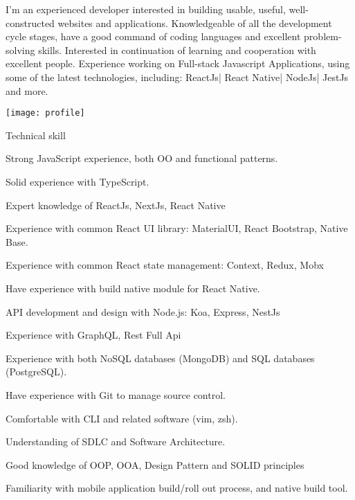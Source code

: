 \documentclass{resume}
\begin{document}

  \noindent\begin{minipage}{0.8\textwidth}%
    I'm an experienced developer interested in building usable, useful, well-constructed websites and applications. 
    Knowledgeable of all the development cycle stages, have a good command of coding languages and excellent problem-solving skills.
    Interested in continuation of learning and cooperation with excellent people.
    Experience working on Full-stack Javascript Applications, using some of the latest technologies, including:
    ReactJs| React Native| NodeJs| JestJs and more.
    \end{minipage}%
    \hfill%
    \begin{minipage}{0.1\textwidth}\raggedright
      \texttt{[image: profile]}
    \end{minipage}

  \begin{rSection}{Technical skill}
    \begin{rSubsection}{}{}{}{}
      \item Strong JavaScript experience, both OO and functional patterns.
      \item Solid experience with TypeScript.
      \item Expert knowledge of ReactJs, NextJs, React Native
      \item Experience with common React UI library: MaterialUI, React Bootstrap, Native Base.
      \item Experience with common React state management: Context, Redux, Mobx
      \item Have experience with build native module for React Native.

      \item API development and design with Node.js: Koa, Express, NestJs
      \item Experience with GraphQL, Rest Full Api
      \item Experience with both NoSQL databases (MongoDB) and SQL databases (PostgreSQL).

      \item Have experience with Git to manage source control.
      \item Comfortable with CLI and related software (vim, zsh).
      \item Understanding of SDLC and Software Architecture.
      \item Good knowledge of OOP, OOA, Design Pattern and SOLID principles
      \item Familiarity with mobile application build/roll out process, and native build tool.
    \end{rSubsection}
  \end{rSection}
  
\end{document}
